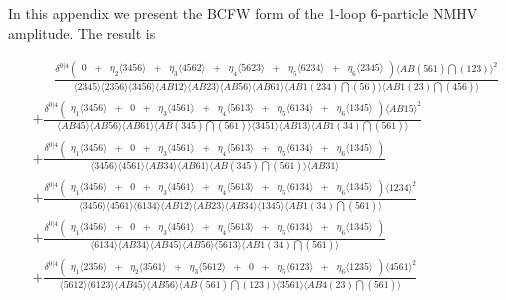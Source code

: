 \documentclass[11pt, reqno]{article}
\newcommand{\ab}[1]{\langle #1\rangle}
\begin{document}
In this appendix we present the BCFW form of the 1-loop 6-particle NMHV amplitude. The result is
\begin{minipage}[h!]{4cm}\footnotesize\begin{align*}&\phantom{\,+\,}\frac{\delta^{0|4}
\left(\begin{array}{lclclclclcl} 0&+&\eta_{2}\ab{3456}&+&\eta_{3}\ab{4562}&+&\eta_{4}\ab{5623}&+&\eta_{5}\ab{6234}&+&\eta_{6}\ab{2345}\end{array}\right)\ab{AB(561)\bigcap(123)}^2}{\ab{2345} \ab{2356} \ab{3456} \ab{AB12} \ab{AB23} \ab{AB56} \ab{AB61} \ab{AB1(234)\bigcap(56)} \ab{AB1(23)\bigcap(456)}}\\
&+\frac{\delta^{0|4}
\left(\begin{array}{lclclclclcl} \eta_{1}\ab{3456}&+&0&+&\eta_{3}\ab{4561}&+&\eta_{4}\ab{5613}&+&\eta_{5}\ab{6134}&+&\eta_{6}\ab{1345}\end{array}\right)\ab{AB15}^2}{\ab{AB45} \ab{AB56} \ab{AB61} \ab{AB(345)\bigcap(561)} \ab{3451} \ab{AB13} \ab{AB1(34)\bigcap(561)}}\\
&+\frac{\delta^{0|4}
\left(\begin{array}{lclclclclcl} \eta_{1}\ab{3456}&+&0&+&\eta_{3}\ab{4561}&+&\eta_{4}\ab{5613}&+&\eta_{5}\ab{6134}&+&\eta_{6}\ab{1345}\end{array}\right)}{\ab{3456} \ab{4561} \ab{AB34} \ab{AB61} \ab{AB(345)\bigcap(561)} \ab{AB31}}\\
&+\frac{\delta^{0|4}
\left(\begin{array}{lclclclclcl} \eta_{1}\ab{3456}&+&0&+&\eta_{3}\ab{4561}&+&\eta_{4}\ab{5613}&+&\eta_{5}\ab{6134}&+&\eta_{6}\ab{1345}\end{array}\right)\ab{1234}^2}{\ab{3456} \ab{4561} \ab{6134} \ab{AB12} \ab{AB23} \ab{AB34} \ab{1345} \ab{AB1(34)\bigcap(561)}}\\
&+\frac{\delta^{0|4}
\left(\begin{array}{lclclclclcl} \eta_{1}\ab{3456}&+&0&+&\eta_{3}\ab{4561}&+&\eta_{4}\ab{5613}&+&\eta_{5}\ab{6134}&+&\eta_{6}\ab{1345}\end{array}\right)}{\ab{6134} \ab{AB34} \ab{AB45} \ab{AB56} \ab{5613} \ab{AB1(34)\bigcap(561)}}\\
&+\frac{\delta^{0|4}
\left(\begin{array}{lclclclclcl} \eta_{1}\ab{2356}&+&\eta_{2}\ab{3561}&+&\eta_{3}\ab{5612}&+&0&+&\eta_{5}\ab{6123}&+&\eta_{6}\ab{1235}\end{array}\right)\ab{4561}^2}{\ab{5612} \ab{6123} \ab{AB45} \ab{AB56} \ab{AB(561)\bigcap(123)} \ab{3561} \ab{AB4(23)\bigcap(561)}}\\

\end{align*}
\end{minipage}
\end{document}
